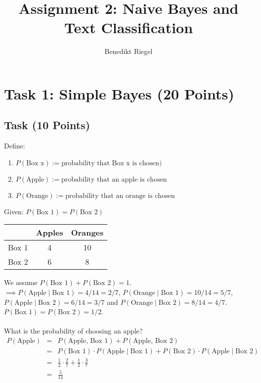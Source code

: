 \documentclass{article}
\title{Assignment 2: Naive Bayes and Text Classification}
\author{Benedikt Riegel}
\begin{document}
	\maketitle
	\section{Task 1: Simple Bayes (20 Points)}
	\subsection{Task (10 Points)}
	Define:
	\begin{enumerate}[label=-]
		\item $P(\text{Box x}) := \text{probability that Box x is chosen})$
		\item $P(\text{Apple}) := \text{probability that an apple is chosen}$
		\item $P(\text{Orange}) := \text{probability that an orange is chosen}$
	\end{enumerate}
	Given: $P(\text{Box 1}) = P(\text{Box 2})$
	\begin{center}
		\begin{tabular}{ |c|c|c| }
			\hline
			& Apples & Oranges \\
			\hline
			Box 1 & 4 & 10 \\
			\hline
			Box 2 & 6 & 8 \\
			\hline
		\end{tabular}
	\end{center}
	We assume $P(\text{Box 1}) + P(\text{Box 2}) = 1$.\\
	$\implies P(\text{Apple}\mid\text{Box 1}) = 4/14 = 2/7$, $P(\text{Orange}\mid\text{Box 1}) = 10/14 = 5/7$,\\
	$P(\text{Apple}\mid\text{Box 2}) = 6/14 = 3/7$ and $P(\text{Orange}\mid\text{Box 2}) = 8/14 = 4/7$.\\
	$P(\text{Box 1}) = P(\text{Box 2}) = 1/2$.\\\\
	What is the probability of choosing an apple?\\
	\begin{eqnarray*}
		P(\text{Apple}) &=& P(\text{Apple, Box 1}) + P(\text{Apple, Box 2})\\
		&=& P(\text{Box 1}) \cdot P(\text{Apple}\mid\text{Box 1}) + P(\text{Box 2}) \cdot P(\text{Apple}\mid\text{Box 2})\\
		&=& \frac{1}{2} \cdot \frac{2}{7} + \frac{1}{2} \cdot \frac{3}{7}\\
		&=& \frac{5}{14}
	\end{eqnarray*}
\end{document}
